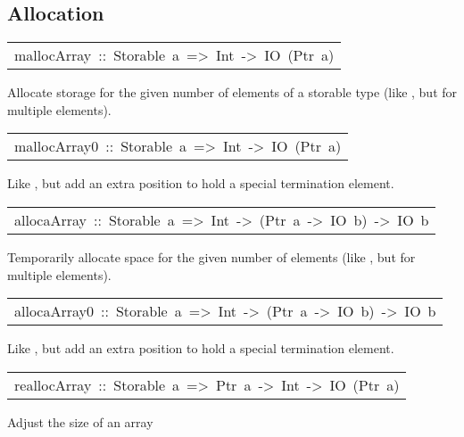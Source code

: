 \subsection{Allocation
}
\begin{haddockdesc}
\item[\begin{tabular}{@{}l}
mallocArray\ ::\ Storable\ a\ =>\ Int\ ->\ IO\ (Ptr\ a)
\end{tabular}]\haddockbegindoc
Allocate storage for the given number of elements of a storable type
 (like , but for multiple elements).
\par

\end{haddockdesc}
\begin{haddockdesc}
\item[\begin{tabular}{@{}l}
mallocArray0\ ::\ Storable\ a\ =>\ Int\ ->\ IO\ (Ptr\ a)
\end{tabular}]\haddockbegindoc
Like , but add an extra position to hold a special
 termination element.
\par

\end{haddockdesc}
\begin{haddockdesc}
\item[\begin{tabular}{@{}l}
allocaArray\ ::\ Storable\ a\ =>\ Int\ ->\ (Ptr\ a\ ->\ IO\ b)\ ->\ IO\ b
\end{tabular}]\haddockbegindoc
Temporarily allocate space for the given number of elements
 (like , but for multiple elements).
\par

\end{haddockdesc}
\begin{haddockdesc}
\item[\begin{tabular}{@{}l}
allocaArray0\ ::\ Storable\ a\ =>\ Int\ ->\ (Ptr\ a\ ->\ IO\ b)\ ->\ IO\ b
\end{tabular}]\haddockbegindoc
Like , but add an extra position to hold a special
 termination element.
\par

\end{haddockdesc}
\begin{haddockdesc}
\item[\begin{tabular}{@{}l}
reallocArray\ ::\ Storable\ a\ =>\ Ptr\ a\ ->\ Int\ ->\ IO\ (Ptr\ a)
\end{tabular}]\haddockbegindoc
Adjust the size of an array
\par

\end{haddockdesc}
